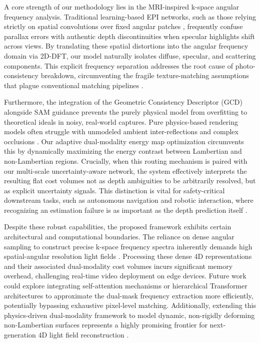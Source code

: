 \documentclass[lettersize,journal]{IEEEtran}
\begin{document}
A core strength of our methodology lies in the MRI-inspired k-space angular frequency analysis. Traditional learning-based EPI networks, such as those relying strictly on spatial convolutions over fixed angular patches \cite{heber2018, lyu2022}, frequently confuse parallax errors with authentic depth discontinuities when specular highlights shift across views. By translating these spatial distortions into the angular frequency domain via 2D-DFT, our model naturally isolates diffuse, specular, and scattering components. This explicit frequency separation addresses the root cause of photo-consistency breakdown, circumventing the fragile texture-matching assumptions that plague conventional matching pipelines \cite{tao2013}.

Furthermore, the integration of the Geometric Consistency Descriptor (GCD) alongside SAM \cite{kirillov2023} guidance prevents the purely physical model from overfitting to theoretical ideals in noisy, real-world captures. Pure physics-based rendering models often struggle with unmodeled ambient inter-reflections and complex occlusions \cite{chen2017}. Our adaptive dual-modality energy map optimization circumvents this by dynamically maximizing the energy contrast between Lambertian and non-Lambertian regions. Crucially, when this routing mechanism is paired with our multi-scale uncertainty-aware network, the system effectively interprets the resulting flat cost volumes not as depth ambiguities to be arbitrarily resolved, but as explicit uncertainty signals. This distinction is vital for safety-critical downstream tasks, such as autonomous navigation and robotic interaction, where recognizing an estimation failure is as important as the depth prediction itself \cite{ng2006}.

Despite these robust capabilities, the proposed framework exhibits certain architectural and computational boundaries. The reliance on dense angular sampling to construct precise k-space frequency spectra inherently demands high spatial-angular resolution light fields \cite{ng2005}. Processing these dense 4D representations and their associated dual-modality cost volumes incurs significant memory overhead, challenging real-time video deployment on edge devices. Future work could explore integrating self-attention mechanisms \cite{vaswani2017} or hierarchical Transformer architectures \cite{liu2021} to approximate the dual-mask frequency extraction more efficiently, potentially bypassing exhaustive pixel-level matching. Additionally, extending this physics-driven dual-modality framework to model dynamic, non-rigidly deforming non-Lambertian surfaces represents a highly promising frontier for next-generation 4D light field reconstruction \cite{ng2022}.
\end{document}
